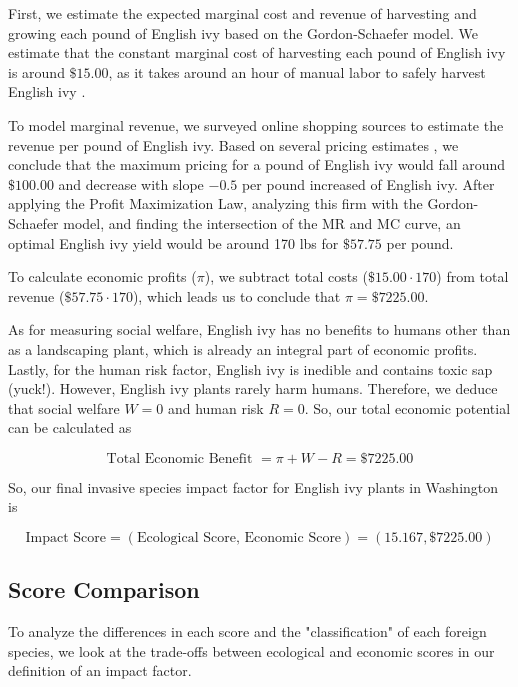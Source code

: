 First, we estimate the expected marginal cost and revenue of harvesting and growing each pound of English ivy based on the Gordon-Schaefer model. We estimate that the constant marginal cost of harvesting each pound of English ivy is around \(\$15.00\), as it takes around an hour of manual labor to safely harvest English ivy \cite{bhgCaringEasytoGrow}. 

To model marginal revenue, we surveyed online shopping sources to estimate the revenue per pound of English ivy. Based on several pricing estimates \cite{gardengoodsdirectEnglish}, we conclude that the maximum pricing for a pound of English ivy would fall around \(\$100.00\) and decrease with slope \(-0.5\) per pound increased of English ivy. After applying the Profit Maximization Law, analyzing this firm with the Gordon-Schaefer model, and finding the intersection of the MR and MC curve, an optimal English ivy yield would be around 170 lbs for \(\$57.75\) per pound. 

To calculate economic profits (\(\pi\)), we subtract total costs (\(\$15.00 \cdot 170\)) from total revenue (\(\$57.75 \cdot 170\)), which leads us to conclude that \(\pi = \$7225.00\).

As for measuring social welfare, English ivy has no benefits to humans other than as a landscaping plant, which is already an integral part of economic profits. Lastly, for the human risk factor, English ivy is inedible and contains toxic sap (yuck!). However, English ivy plants rarely harm humans. Therefore, we deduce that social welfare \(W = 0\) and human risk \(R = 0\). So, our total economic potential can be calculated as 

\[\text{Total Economic Benefit } = \pi + W - R = \$7225.00\]

So, our final invasive species impact factor for English ivy plants in Washington is

\[\text{Impact Score} = (\text{Ecological Score, Economic Score}) = (15.167, \$7225.00)\]

\subsection{Score Comparison}

To analyze the differences in each score and the "classification" of each foreign species, we look at the trade-offs between ecological and economic scores in our definition of an impact factor.


